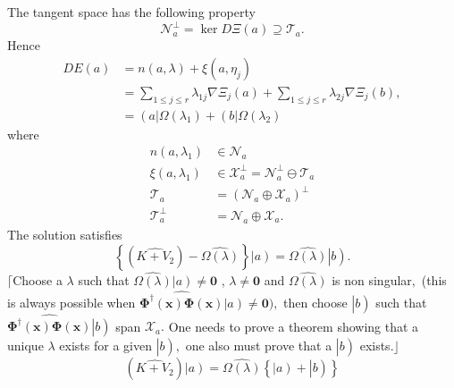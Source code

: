 \documentclass[aps,preprint]{revtex4}%
\begin{document}
The tangent space has the following property
\begin{equation}
\mathcal{N}_{a}^{\bot}=\ker D\Xi\left(  a\right)  \supseteq\mathcal{T}_{a}.
\end{equation}
Hence
\begin{align}
DE\left(  a\right)   &  =n\left(  a,\lambda\right)  +\xi\left(  a,\eta
_{j}\right) \nonumber\\
&  =\sum_{1\leq j\leq r}\lambda_{1j}\nabla\Xi_{j}\left(  a\right)
+\sum_{1\leq j\leq r}\lambda_{2j}\nabla\Xi_{j}\left(  b\right)  ,\nonumber\\
&  =\left(  a\right\vert \Omega\left(  \lambda_{1}\right)  +\left(
b\right\vert \Omega\left(  \lambda_{2}\right)
\end{align}
where
\begin{align}
n\left(  a,\lambda_{1}\right)   &  \in\mathcal{N}_{a}\nonumber\\
\xi\left(  a,\lambda_{1}\right)   &  \in\mathcal{X}_{a}^{\bot}=\mathcal{N}%
_{a}^{\bot}\ominus\mathcal{T}_{a}\nonumber\\
\mathcal{T}_{a}  &  =\left(  \mathcal{N}_{a}\oplus\mathcal{X}_{a}\right)
^{\bot}\nonumber\\
\mathcal{T}_{a}^{\bot}  &  =\mathcal{N}_{a}\oplus\mathcal{X}_{a}.
\end{align}
The solution satisfies
\begin{equation}
\left\{  \left(  \widehat{K+V_{2}}\right)  -\widehat{\Omega\left(
\lambda\right)  }\right\}  \left\vert \overset{}{a}\right)  =\widehat
{\Omega\left(  \lambda\right)  }\left\vert \overset{}{b}\right)  .
\end{equation}
$\lceil$Choose a $\lambda$ such that $\widehat{\Omega\left(  \lambda\right)
}\left\vert \overset{}{a}\right)  \neq\mathbf{0}$ , $\lambda\neq\mathbf{0}$
and $\widehat{\Omega\left(  \lambda\right)  }$ is non singular$\mathbf{,}$
(this is always possible when $\widehat{\mathbf{\Phi}^{\dagger}\left(
\mathbf{x}\right)  \mathbf{\Phi}\left(  \mathbf{x}\right)  }\left\vert
\overset{}{a}\right)  \neq\mathbf{0),}$ then choose $\left\vert \overset{}%
{b}\right)  $ such that $\widehat{\mathbf{\Phi}^{\dagger}\left(
\mathbf{x}\right)  \mathbf{\Phi}\left(  \mathbf{x}\right)  }\left\vert
\overset{}{b}\right)  $ span $\mathcal{X}_{a}.$ One needs to prove a theorem
showing that a unique $\lambda$ exists for a given $\left\vert \overset{}%
{b}\right)  ,$ one also must prove that a $\left\vert \overset{}{b}\right)  $
exists$.\rfloor$%
\begin{equation}
\left(  \widehat{K+V_{2}}\right)  \left\vert \overset{}{a}\right)
=\widehat{\Omega\left(  \lambda\right)  }\left\{  \left\vert \overset{}%
{a}\right)  +\left\vert \overset{}{b}\right)  \right\}
\end{equation}
\end{document}

